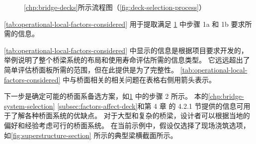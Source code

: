 \begin{figure}
  \caption{\cref{chp:bridge-decks}所示流程图（\cref{fig:deck-selection-process}）}\label{fig:flowchart-guide}
\end{figure}

\cref{tab:operational-local-factors-considered} 用于提取满足 \cref{fig:flowchart-guide} 中步骤 1a 和 1b 要求所需的信息。


\begin{table}
  \caption{要考虑的运营和当地因素——\cref{fig:flowchart-guide} 中的步骤 1a 和 1b}\label{tab:operational-local-factors-considered}
\end{table}

\cref{tab:operational-local-factors-considered} 中显示的信息是根据项目要求开发的，举例说明了整个桥梁{系统}的布局和{使用寿命}评估所需的信息类型。 它远远超出了简单评估桥面板所需的范围，但在此提供是为了完整性。 \cref{tab:operational-local-factors-considered} 中与桥面相关的相关问题在表格右侧用箭头表示。

下一步是确定可能的桥面系备选方案，如\cref{fig:flowchart-guide} 中的步骤 2 所示。 本的\cref{chp:bridge-system-selection} \cref{subsec:factors-affect-deck}和第 4 章 的 4.2.1 节提供的信息可用于了解各种桥面系统的优缺点。 对于大型和复杂的桥梁，设计者可以根据当地的偏好和经验考虑可行的桥面系统。 在当前示例中，假设仅选择了现场浇筑选项，如\cref{fig:superstructure-section} 所示的典型梁横截面所示。

